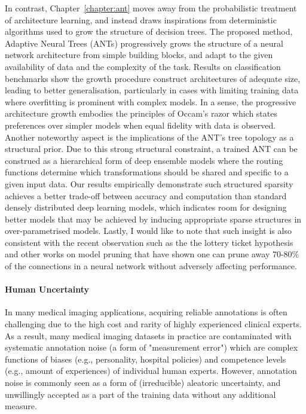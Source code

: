 In contrast, Chapter~\ref{chapter:ant} moves away from the probabilistic treatment of architecture learning, and instead draws inspirations from deterministic algorithms used to grow the structure of decision trees. The proposed method, Adaptive Neural Trees (ANTs) progressively grows the structure of a neural network architecture from simple building blocks, and adapt to the given availability of data and the complexity of the task. Results on classification benchmarks show the growth procedure construct architectures of adequate size, leading to better generalisation, particularly in cases with limiting training data where overfitting is prominent with complex models. In a sense, the progressive architecture growth embodies the principles of Occam's razor \cite{rasmussen2001occam} which states preferences over simpler models when equal fidelity with data is observed. Another noteworthy aspect is the implications of the ANT's tree topology as a structural prior. Due to this strong structural constraint, a trained ANT can be construed as a hierarchical form of deep ensemble models \cite{lakshminarayanan2017simple} where the routing functions determine which transformations should be shared and specific to a given input data. Our results empirically demonstrate such structured sparsity achieves a better trade-off between accuracy and computation than standard densely distributed deep learning models, which indicates room for designing better models that may be achieved by inducing appropriate sparse structures in over-parametrised models.  Lastly, I would like to note that such insight is also consistent with the recent observation such as the the lottery ticket hypothesis \cite{frankle2018lottery} and other works on model pruning \cite{molchanov2016pruning,zhu2017prune} that have shown one can prune away 70-80\% of the connections in a neural network without adversely affecting performance.

\paragraph{Human Uncertainty}
In many medical imaging applications, acquiring reliable annotations is often challenging due to the high cost and rarity of highly experienced clinical experts. As a result, many medical imaging datasets in practice are contaminated with systematic annotation noise (a form of "measurement error") which are complex functions of biases (e.g., personality, hospital policies) and competence levels (e.g., amount of experiences) of individual human experts. However, annotation noise is commonly seen as a form of (irreducible) aleatoric uncertainty, and unwillingly accepted as a part of the training data without any additional measure. 

